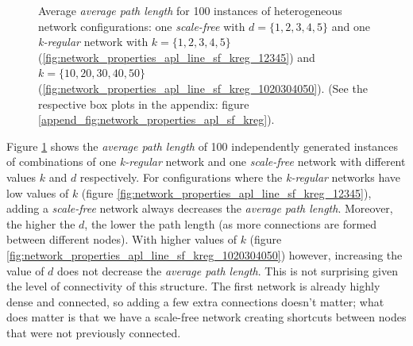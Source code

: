 \documentclass[preprint,number]{elsarticle}
\begin{document}
\begin{figure}[H]
          \begin{minipage}{0.9\textwidth}
            \vspace{0.2cm}
            \caption{Average \textit{average path length} for 100 instances of heterogeneous network
              configurations: one \textit{scale-free} with $d=\{1,2,3,4,5\}$ and one
              \textit{k-regular} network with $k=\{1,2,3,4,5\}$
              (\ref{fig:network_properties_apl_line_sf_kreg_12345}) and $k=\{10,20,30,40,50\}$
              (\ref{fig:network_properties_apl_line_sf_kreg_1020304050}). (See the respective box
              plots in the appendix: figure \ref{append_fig:network_properties_apl_sf_kreg}).}
            \label{fig:network_properties_line_apl_sf_kreg}
          \end{minipage}
        \end{figure}

        Figure \ref{fig:network_properties_line_apl_sf_kreg} shows the \textit{average path length}
        of 100 independently generated instances of combinations of one \textit{k-regular} network
        and one \textit{scale-free} network with different values $k$ and $d$ respectively. For
        configurations where the \textit{k-regular} networks have low values of $k$ (figure
        \ref{fig:network_properties_apl_line_sf_kreg_12345}), adding a \textit{scale-free} network
        always decreases the \textit{average path length}. Moreover, the higher the $d$, the lower
        the path length (as more connections are formed between different nodes). With higher values
        of $k$ (figure \ref{fig:network_properties_apl_line_sf_kreg_1020304050}) however, increasing
        the value of $d$ does not decrease the \textit{average path length}. This is not surprising
        given the level of connectivity of this structure. The first network is already highly dense
        and connected, so adding a few extra connections doesn't matter; what does matter is that we
        have a scale-free network creating shortcuts between nodes that were not previously
        connected.
\end{document}
